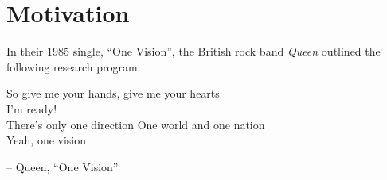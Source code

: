\setcounter{section}{0}

\section{Motivation}

In their 1985 single, \enquote{One Vision}, 
the British rock band \textit{Queen} outlined the 
following research program:
\begin{center}
  So give me your hands, give me your hearts\\
  I'm ready!\\
  There's only one direction
  One world and one nation\\
  Yeah, one vision
\end{center}
\begin{flushright}
  \small{
  -- Queen, ``One Vision''}
\end{flushright}
%
